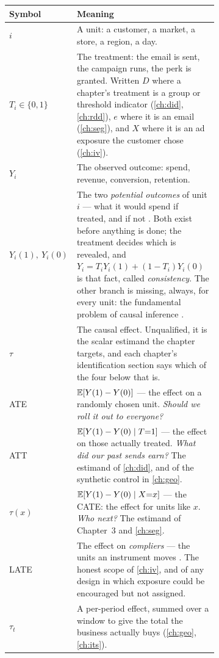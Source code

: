 \begin{center}
\small
\begin{longtable}{@{}l@{\hspace{1.5em}}p{0.68\linewidth}@{}}
\toprule
\textbf{Symbol} & \textbf{Meaning} \\
\midrule
\endhead
$i$ & A unit: a customer, a market, a store, a region, a day. \\[2pt]
$T_i \in \{0,1\}$ & The treatment: the email is sent, the campaign runs, the perk is granted.
  Written $D$ where a chapter's treatment is a group or threshold indicator (\cref{ch:did},
  \cref{ch:rdd}), $e$ where it is an email (\cref{ch:seg}), and $X$ where it is an ad exposure the
  customer chose (\cref{ch:iv}). \\[2pt]
$Y_i$ & The observed outcome: spend, revenue, conversion, retention. \\[2pt]
$Y_i(1),\ Y_i(0)$ & The two \emph{potential outcomes} of unit $i$ --- what it would spend if
  treated, and if not \citep{neyman1923, rubin1974}. Both exist before anything is done; the
  treatment decides which is revealed, and $Y_i = T_i Y_i(1) + (1 - T_i) Y_i(0)$ is that fact,
  called \emph{consistency}. The other branch is missing, always, for every unit: the fundamental
  problem of causal inference \citep{holland1986}. \\[2pt]
$\tau$ & The causal effect. Unqualified, it is the scalar estimand the chapter targets, and each
  chapter's identification section says which of the four below that is. \\[2pt]
ATE & $\operatorname{\mathbb{E}}[Y(1) - Y(0)]$ --- the effect on a randomly chosen unit. \emph{Should we roll it out to
  everyone?} \\[2pt]
ATT & $\operatorname{\mathbb{E}}[Y(1) - Y(0) \mid T{=}1]$ --- the effect on those actually treated. \emph{What did our
  past sends earn?} The estimand of \cref{ch:did}, and of the synthetic control in
  \cref{ch:geo}. \\[2pt]
$\tau(x)$ & $\operatorname{\mathbb{E}}[Y(1) - Y(0) \mid X{=}x]$ --- the CATE: the effect for units like $x$. \emph{Who
  next?} The estimand of Chapter~3 and \cref{ch:seg}. \\[2pt]
LATE & The effect on \emph{compliers} --- the units an instrument moves \citep{imbens1994,
  angrist1996}. The honest scope of \cref{ch:iv}, and of any design in which exposure could be
  encouraged but not assigned. \\[2pt]
$\tau_t$ & A per-period effect, summed over a window to give the total the business actually buys
  (\cref{ch:geo}, \cref{ch:its}). \\
\bottomrule
\end{longtable}
\end{center}

